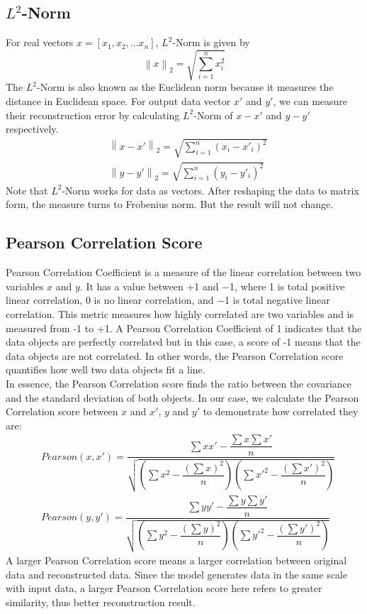 \documentclass[12pt]{report} %
\newcommand{\norm}[1]{\left\lVert #1 \right\rVert}
\begin{document}
\subsection{$L^2$-Norm}
For real vectors $x=[x_1,x_2,...x_n]$, $L^2$-Norm\cite{NORM} is given by
\begin{equation}
\norm{x}_2=\sqrt{\sum _{i=1}^{n}x_i^2}
\end{equation}
The $L^2$-Norm is also known as the Euclidean norm because it measures the distance in Euclidean space. For output data vector $x'$ and $y'$, we can measure their reconstruction error by calculating $L^2$-Norm of $x-x'$ and $y-y'$ respectively.
\begin{equation}
\begin{split}
&\norm{x-x'}_2=\sqrt{\sum _{i=1}^{n}(x_i-x'_i)^2} \\
&\norm{y-y'}_2=\sqrt{\sum _{i=1}^{n}(y_i-y'_i)^2}
\end{split}
\end{equation}
Note that $L^2$-Norm works for data as vectors. After reshaping the data to matrix form, the measure turns to Frobenius norm\cite{NORM}. But the result will not change.

\subsection{Pearson Correlation Score}
Pearson Correlation Coefficient\cite{PCC, PCC2} is a measure of the linear correlation between two variables $x$ and $y$. It has a value between +1 and −1, where 1 is total positive linear correlation, 0 is no linear correlation, and −1 is total negative linear correlation. This metric measures how highly correlated are two variables and is measured from -1 to +1. A Pearson Correlation Coefficient of 1 indicates that the data objects are perfectly correlated but in this case, a score of -1 means that the data objects are not correlated. In other words, the Pearson Correlation score quantifies how well two data objects fit a line. \\
In essence, the Pearson Correlation score finds the ratio between the covariance and the standard deviation of both objects. In our case, we calculate the Pearson Correlation score between $x$ and $x'$, $y$ and $y'$ to demonstrate how correlated they are:
\begin{equation}
\begin{split}
&Pearson(x,x')= \dfrac{\sum xx'-\dfrac{\sum x \sum x'}{n}}{\sqrt{(\sum x^2-\dfrac{(\sum x)^2}{n})(\sum x'^2-\dfrac{(\sum x')^2}{n})}}\\
&Pearson(y,y')= \dfrac{\sum yy'-\dfrac{\sum y \sum y'}{n}}{\sqrt{(\sum y^2-\dfrac{(\sum y)^2}{n})(\sum y'^2-\dfrac{(\sum y')^2}{n})}}
\end{split}
\end{equation}
A larger Pearson Correlation score means a larger correlation between original data and reconstructed data. Since the model generates data in the same scale with input data, a larger Pearson Correlation score here refers to greater similarity, thus better reconstruction result.
\end{document}

